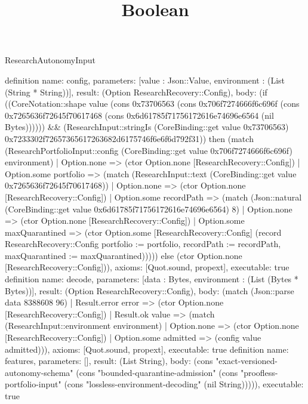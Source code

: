 \begin{lexlean}{ResearchAutonomyInput}
\title{Boolean}
\begin{semanticmodule}
definition{
 name: config,
 parameters: [value : Json::Value, environment : (List (String * String))],
 result: (Option ResearchRecovery::Config),
 body: (if ((CoreNotation::shape value (cons 0x73706563 (cons 0x706f7274666f6c696f (cons 0x7265636f72645f70617468 (cons 0x6d61785f71756172616e74696e6564 (nil Bytes)))))) && (ResearchInput::stringIs (CoreBinding::get value 0x73706563) 0x7233302f72657365617263682d6175746f6e6f6d792f31)) then (match (ResearchPortfolioInput::config (CoreBinding::get value 0x706f7274666f6c696f) environment) | Option.none => (ctor Option.none [ResearchRecovery::Config]) | Option.some portfolio => (match (ResearchInput::text (CoreBinding::get value 0x7265636f72645f70617468)) | Option.none => (ctor Option.none [ResearchRecovery::Config]) | Option.some recordPath => (match (Json::natural (CoreBinding::get value 0x6d61785f71756172616e74696e6564) 8) | Option.none => (ctor Option.none [ResearchRecovery::Config]) | Option.some maxQuarantined => (ctor Option.some [ResearchRecovery::Config] (record ResearchRecovery::Config {portfolio := portfolio, recordPath := recordPath, maxQuarantined := maxQuarantined}))))) else (ctor Option.none [ResearchRecovery::Config])),
 axioms: [Quot.sound, propext],
 executable: true
}
definition{
 name: decode,
 parameters: [data : Bytes, environment : (List (Bytes * Bytes))],
 result: (Option ResearchRecovery::Config),
 body: (match (Json::parse data 8388608 96) | Result.error error => (ctor Option.none [ResearchRecovery::Config]) | Result.ok value => (match (ResearchInput::environment environment) | Option.none => (ctor Option.none [ResearchRecovery::Config]) | Option.some admitted => (config value admitted))),
 axioms: [Quot.sound, propext],
 executable: true
}
definition{
 name: features,
 parameters: [],
 result: (List String),
 body: (cons "exact-versioned-autonomy-schema" (cons "bounded-quarantine-admission" (cons "proofless-portfolio-input" (cons "lossless-environment-decoding" (nil String))))),
 executable: true
}
\end{semanticmodule}
\end{lexlean}
